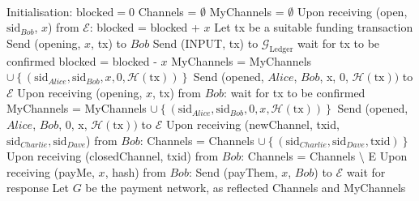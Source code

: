 \ \\ 
  \label{alg:lightningprot}
  \begin{algorithmic}[1]
    \State Initialisation:
      \State $\mathrm{blocked} = 0$
      \State Channels = $\emptyset$
      \State MyChannels = $\emptyset$
    \State
    \State Upon receiving (open, $\mathrm{sid}_{Bob}$, $x$) from $\mathcal{E}$:
        \State blocked = blocked + $x$
        \State Let tx be a suitable funding transaction
        \State Send (opening, $x$, tx) to $Bob$
        \State Send (INPUT, tx) to $\mathcal{G}_{\mathrm{Ledger}}$
        \State wait for tx to be confirmed 
        \State blocked = blocked - $x$
        \State MyChannels = MyChannels $\cup \left\{\left(\mathrm{sid}_{Alice},
        \mathrm{sid}_{Bob}, x, 0, \mathcal{H}\left(\mathrm{tx}\right)\right)\right\}$
        \State Send (opened, $Alice$, $Bob$, x, 0, $\mathcal{H}\left(\mathrm{tx}\right))$
        to $\mathcal{E}$
      \EndIf
    \State
    \State Upon receiving (opening, $x$, tx) from $Bob$:
      \State wait for tx to be confirmed
      \State MyChannels = MyChannels $\cup \left\{\left(\mathrm{sid}_{Alice},
      \mathrm{sid}_{Bob}, 0, x, \mathcal{H}\left(\mathrm{tx}\right)\right)\right\}$
      \State Send (opened, $Alice$, $Bob$, 0, x, $\mathcal{H}\left(\mathrm{tx}\right))$ to
      $\mathcal{E}$
    \State
    \State Upon receiving (newChannel, txid, $\mathrm{sid}_{Charlie},
    \mathrm{sid}_{Dave}$) from $Bob$:
      \State Channels = Channels $\cup \left\{\left(\mathrm{sid}_{Charlie},
      \mathrm{sid}_{Dave}, \mathrm{txid}\right)\right\}$
    \EndIf
    \State
    \State Upon receiving (closedChannel, txid) from $Bob$:
      \State Channels = Channels $\setminus$ E
    \EndIf
    \State
    \State Upon receiving (payMe, $x$, hash) from $Bob$:
      \State Send (payThem, $x$, $Bob$) to $\mathcal{E}$
      \State wait for response
        \State Let $G$ be the payment network, as reflected Channels and MyChannels
\end{algorithmic}
